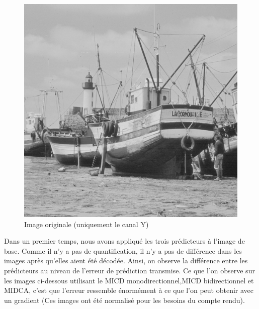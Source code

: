 \documentclass[12pt]{report}
\begin{document}
\begin{figure}[H]
\begin{center}
\includegraphics[scale=0.4]{../ImageRes/Imageoriginale.jpg} 
\caption{Image originale (uniquement le canal Y)}
\end{center}
\end{figure}

Dans un premier temps, nous avons appliqué les trois prédicteurs à l'image de base. Comme il n'y a pas de quantification, il n'y a pas de différence dans les images après qu'elles aient été décodée. Ainsi, on observe la différence entre les prédicteurs au niveau de l'erreur de prédiction transmise. 
Ce que l'on observe sur les images ci-dessous utilisant le MICD monodirectionnel,MICD bidirectionnel et MIDCA, c'est que l'erreur ressemble énormément à ce que l'on peut obtenir avec un gradient (Ces images ont été normalisé pour les besoins du compte rendu). 
\end{document}

